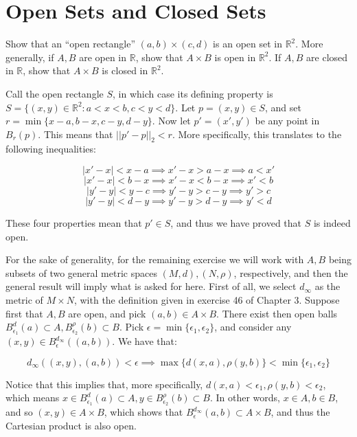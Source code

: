 \chapter{Open Sets and Closed Sets}

\begin{exercise}{1}
    Show that an ``open rectangle'' $(a, b) \times (c, d)$ is an open set in $\mathbb{R}^2$.
    More generally, if $A, B$ are open in $\mathbb{R}$, show that $A \times B$ is open in $\mathbb{R}^2$.
    If $A, B$ are closed in $\mathbb{R}$, show that $A \times B$ is closed in $\mathbb{R}^2$.
\end{exercise}

\begin{solution}
    
    Call the open rectangle $S$, in which case its defining property is $S = \{(x, y) \in \mathbb{R}^2 : a < x < b, c < y < d\}$.
    Let $p = (x, y) \in S$, and set $r = \min\{x - a, b - x, c - y, d - y\}$.
    Now let $p' = (x', y')$ be any point in $B_r(p)$.
    This means that $\lvert \lvert p' - p \rvert \rvert_2 < r$.
    More specifically, this translates to the following inequalities:

    $$\lvert x' - x \rvert < x - a \implies x' - x > a - x \implies a < x'$$
    $$\lvert x' - x \rvert < b - x \implies x' - x < b - x \implies x' < b$$    
    $$\lvert y' - y \rvert < y - c \implies y' - y > c - y \implies y' > c$$
    $$\lvert y' - y \rvert < d - y \implies y' - y > d - y \implies y' < d$$

    These four properties mean that $p' \in S$, and thus we have proved that $S$ is indeed open.

    For the sake of generality, for the remaining exercise we will work with $A, B$ being subsets of two general metric spaces $(M, d), (N, \rho)$, respectively, and then the general result will imply what is asked for here.
    First of all, we select $d_{\infty}$ as the metric of $M \times N$, with the definition given in exercise 46 of Chapter 3.
    Suppose first that $A, B$ are open, and pick $(a, b) \in A \times B$.
    There exist then open balls $B_{\epsilon_1}^{d}(a) \subset A, B_{\epsilon_2}^{\rho}(b) \subset B$.
    Pick $\epsilon = \min\{\epsilon_1, \epsilon_2\}$, and consider any $(x, y) \in B_{\epsilon}^{d_{\infty}}((a, b))$.
    We have that:
    
    $$d_{\infty}((x, y), (a, b)) < \epsilon \implies \max\{d(x, a), \rho(y, b)\} < \min\{\epsilon_1, \epsilon_2\}$$

    Notice that this implies that, more specifically, $d(x, a) < \epsilon_1, \rho(y, b) < \epsilon_2$, which means $x \in B_{\epsilon_1}^{d}(a) \subset A, y \in B_{\epsilon_2}^{\rho}(b) \subset B$.
    In other words, $x \in A, b \in B$, and so $(x, y) \in A \times B$, which shows that $B_{\epsilon}^{d_{\infty}}(a, b) \subset A \times B$, and thus the Cartesian product is also open.


\end{solution}
